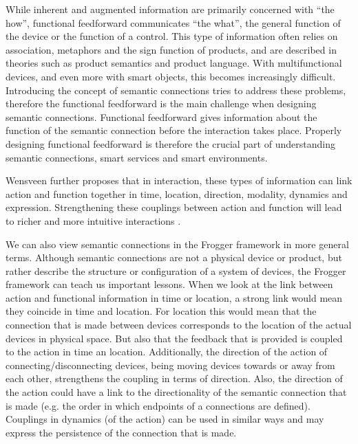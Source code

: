 While inherent and augmented information are primarily concerned with ``the how'', functional feedforward communicates ``the what'', the general function of the device or the function of a control. This type of information often relies on association, metaphors and the sign function of products, and are described in theories such as product semantics and product language. With multifunctional devices, and even more with smart objects, this becomes increasingly difficult. Introducing the concept of semantic connections tries to address these problems, therefore the functional feedforward is the main challenge when designing semantic connections. Functional feedforward gives information about the function of the semantic connection before the interaction takes place. Properly designing functional feedforward is therefore the crucial part of understanding semantic connections, smart services and smart environments.

Wensveen \cite{Wensveen2004} further proposes that in interaction, these types of information can link action and function together in time, location, direction, modality, dynamics and expression. Strengthening these couplings between action and function will lead to richer and more intuitive interactions \cite{Wensveen2005}.
 
We can also view semantic connections in the Frogger framework in more general terms. Although semantic connections are not a physical device or product, but rather describe the structure or configuration of a system of devices, the Frogger framework can teach us important lessons. When we look at the link between action and functional information in time or location, a strong link would mean they coincide in time and location. For location this would mean that the connection that is made between devices corresponds to the location of the actual devices in physical space. But also that the feedback that is provided is coupled to the action in time an location. Additionally, the direction of the action of connecting/disconnecting devices, being moving devices towards or away from each other, strengthens the coupling in terms of direction. Also, the direction of the action could have a link to the directionality of the semantic connection that is made (e.g. the order in which endpoints of a connections are defined). Couplings in dynamics (of the action) can be used in similar ways and may express the persistence of the connection that is made. 



